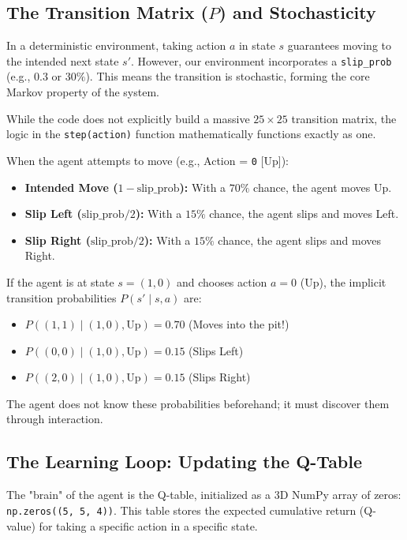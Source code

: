 \subsection{\textcolor{secondary}{The Transition Matrix ($P$) and Stochasticity}}
In a deterministic environment, taking action $a$ in state $s$ guarantees moving to the intended next state $s'$. However, our environment incorporates a \texttt{slip\_prob} (e.g., $0.3$ or $30\%$). This means the transition is stochastic, forming the core Markov property of the system.

While the code does not explicitly build a massive $25 \times 25$ transition matrix, the logic in the \texttt{step(action)} function mathematically functions exactly as one.

When the agent attempts to move (e.g., Action = \texttt{0} [Up]):
\begin{itemize}
    \item \textbf{Intended Move ($1 - \text{slip\_prob}$):} With a $70\%$ chance, the agent moves Up.
    \item \textbf{Slip Left ($\text{slip\_prob} / 2$):} With a $15\%$ chance, the agent slips and moves Left.
    \item \textbf{Slip Right ($\text{slip\_prob} / 2$):} With a $15\%$ chance, the agent slips and moves Right.
\end{itemize}

If the agent is at state $s = (1,0)$ and chooses action $a = 0$ (Up), the implicit transition probabilities $P(s' \mid s, a)$ are:
\begin{itemize}
    \item $P((1,1) \mid (1,0), \text{Up}) = 0.70$ (Moves into the pit!)
    \item $P((0,0) \mid (1,0), \text{Up}) = 0.15$ (Slips Left)
    \item $P((2,0) \mid (1,0), \text{Up}) = 0.15$ (Slips Right)
\end{itemize}
The agent does not know these probabilities beforehand; it must discover them through interaction.

\subsection{\textcolor{secondary}{The Learning Loop: Updating the Q-Table}}
The "brain" of the agent is the Q-table, initialized as a 3D NumPy array of zeros: \texttt{np.zeros((5, 5, 4))}. This table stores the expected cumulative return (Q-value) for taking a specific action in a specific state.

